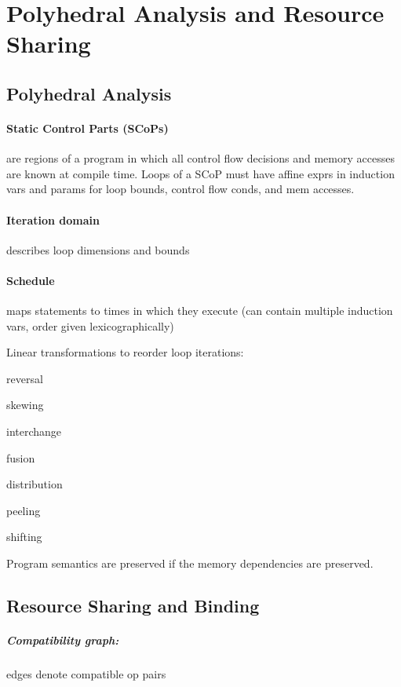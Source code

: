 \documentclass[a4paper]{article}
\begin{document}
\section{Polyhedral Analysis and Resource Sharing}

\subsection{Polyhedral Analysis}

\paragraph{Static Control Parts (SCoPs)} are regions of a program in which all control flow decisions and memory accesses are known at compile time. Loops of a SCoP must have affine exprs in induction vars and params for loop bounds, control flow conds, and mem accesses.

\paragraph{Iteration domain} describes loop dimensions and bounds

\paragraph{Schedule} maps statements to times in which they execute (can contain multiple induction vars, order given lexicographically)

Linear transformations to reorder loop iterations:
\begin{itemize*}
    \item reversal
    \item skewing
    \item interchange
    \item fusion
    \item distribution
    \item peeling
    \item shifting
\end{itemize*}

Program semantics are preserved if the memory dependencies are preserved.

\subsection{Resource Sharing and Binding}

\subparagraph{Compatibility graph:} edges denote compatible op pairs
\end{document}
